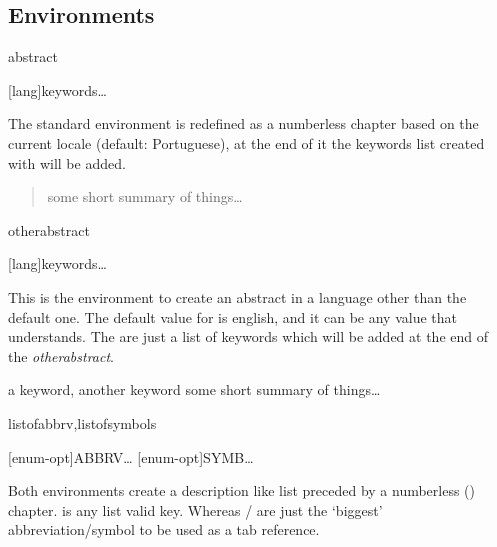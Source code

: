 \documentclass[dctools,english]{ufrgscca} %
\begin{document}
\subsection{Environments}

\begin{Envs}{abstract}
	\begin{Syntax}%
		\Macro{\begin{abstract}}[lang]{keywords}\ldots\Macro{\end{abstract}}{}
	\end{Syntax}
	The standard environment  is redefined as a numberless chapter based on the current locale (default: Portuguese), at the end of it the keywords list created with \Macro{\keyword}{} will be added.
\end{Envs}

\begin{stcode}[st=d.abstract]
	\keyword{a keyword}
	\keyword{another keyword}
	\begin{abstract} some short summary of things\ldots
	\end{abstract}
\end{stcode}

\begin{Envs}{otherabstract}
	\begin{Syntax}%
		\Macro{\begin{otherabstract}}[lang]{keywords}\ldots\Macro{\end{otherabstract}}{}
	\end{Syntax}
This is the environment to create an abstract in a language other than the default one.
The default value for  is english, and it can be any value that  understands. The  are just a list of keywords which will be added at the end of the \emph{otherabstract}.
\end{Envs}

\begin{stcode}[st=d.oabstract]
	\begin{otherabstract}[english]{a keyword, another keyword} some short summary of things\ldots
	\end{otherabstract}
\end{stcode}


\begin{Envs}{listofabbrv,listofsymbols}
	\begin{Syntax}%
	\Macro{\begin{listofabbrv}}[enum-opt]{ABBRV}\ldots\Macro{\end{listofabbrv}}{}
	\Macro{\begin{listofsymbols}}[enum-opt]{SYMB}\ldots\Macro{\end{listofsymbols}}{}
	\end{Syntax}
\end{Envs}
Both environments create a description like list preceded by a numberless (\Macro{\nonum}{}) chapter.  is any  list valid key. Whereas  /  are just the `biggest' abbreviation/symbol to be used as a tab reference.
\end{document}
